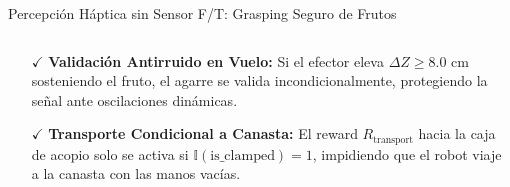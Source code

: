 \begin{frame}{Percepción Háptica sin Sensor F/T: Grasping Seguro de Frutos}
\begin{columns}[T, onlytextwidth]
    \begin{column}{0.485\textwidth}
      \begin{tcolorbox}[
        enhanced,
        colback=AgriGreenLight,
        colframe=AgriGreen,
        arc=\CardArc,
        boxrule=\CardRule,
        height=\CardHeightDouble,
        title={\CardTitleFont Certificación de Cosecha y Acopio},
        colbacktitle=AgriGreen,
        coltitle=WhiteBg,
        top=1.2mm, bottom=1.2mm, left=1.8mm, right=1.8mm
      ]
        {\BodyFont
        \begin{itemize}\setlength{\itemsep}{2pt}
          \item[\textcolor{AgriGreen}{\textbf{$\checkmark$}}] \textbf{Validación Antirruido en Vuelo:} Si el efector eleva $\Delta Z \ge 8.0\text{ cm}$ sosteniendo el fruto, el agarre se valida incondicionalmente, protegiendo la señal ante oscilaciones dinámicas.
          \item[\textcolor{AgriGreen}{\textbf{$\checkmark$}}] \textbf{Transporte Condicional a Canasta:} El reward $R_{\text{transport}}$ hacia la caja de acopio solo se activa si $\mathbb{I}(\text{is\_clamped}) = 1$, impidiendo que el robot viaje a la canasta con las manos vacías.
        \end{itemize}}
      \end{tcolorbox}
    \end{column}
  \end{columns}
\end{frame}

